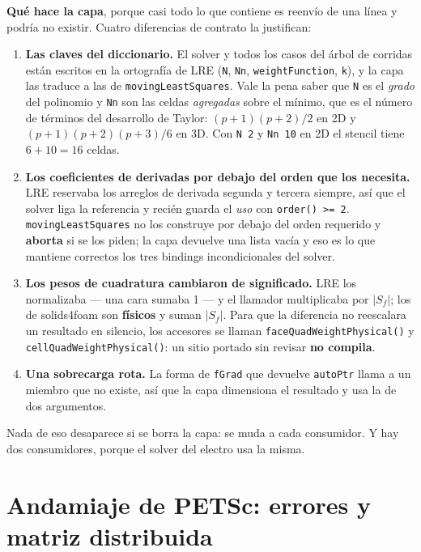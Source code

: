\documentclass[11pt,a4paper]{article}
\begin{document}
\textbf{Qué hace la capa}, porque casi todo lo que contiene es reenvío de una
línea y podría no existir. Cuatro diferencias de contrato la justifican:

\begin{enumerate}
  \item \textbf{Las claves del diccionario.} El solver y todos los casos del
        árbol de corridas están escritos en la ortografía de LRE
        (\texttt{N}, \texttt{Nn}, \texttt{weightFunction}, \texttt{k}), y la capa
        las traduce a las de \texttt{movingLeastSquares}. Vale la pena saber que
        \texttt{N} es el \emph{grado} del polinomio y \texttt{Nn} son las celdas
        \emph{agregadas} sobre el mínimo, que es el número de términos del
        desarrollo de Taylor: $(p{+}1)(p{+}2)/2$ en 2D y
        $(p{+}1)(p{+}2)(p{+}3)/6$ en 3D. Con \texttt{N 2} y \texttt{Nn 10} en 2D
        el stencil tiene $6+10=16$ celdas.
  \item \textbf{Los coeficientes de derivadas por debajo del orden que los
        necesita.} LRE reservaba los arreglos de derivada segunda y tercera
        siempre, así que el solver liga la referencia y recién guarda el
        \emph{uso} con \texttt{order() >= 2}. \texttt{movingLeastSquares} no los
        construye por debajo del orden requerido y \textbf{aborta} si se los
        piden; la capa devuelve una lista vacía y eso es lo que mantiene
        correctos los tres bindings incondicionales del solver.
  \item \textbf{Los pesos de cuadratura cambiaron de significado.} LRE los
        normalizaba --- una cara sumaba 1 --- y el llamador multiplicaba por
        $|S_f|$; los de solids4foam son \textbf{físicos} y suman $|S_f|$. Para
        que la diferencia no reescalara un resultado en silencio, los accesores
        se llaman \texttt{faceQuadWeightPhysical()} y
        \texttt{cellQuadWeightPhysical()}: un sitio portado sin revisar
        \textbf{no compila}.
  \item \textbf{Una sobrecarga rota.} La forma de \texttt{fGrad} que devuelve
        \texttt{autoPtr} llama a un miembro que no existe, así que la capa
        dimensiona el resultado y usa la de dos argumentos.
\end{enumerate}

Nada de eso desaparece si se borra la capa: se muda a cada consumidor. Y hay dos
consumidores, porque el solver del electro usa la misma.

\section{Andamiaje de PETSc: errores y matriz distribuida}
\end{document}
